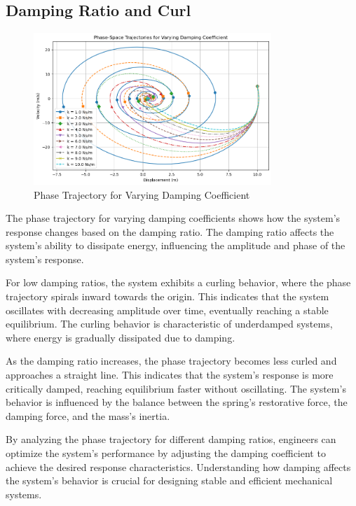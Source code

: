 \documentclass[12pt,a4paper]{article}
\begin{document}
{\vspace{5pt}}

\subsection{Damping Ratio and Curl}
\begin{figure}[H]
    \centering
    \includegraphics[width=0.8\textwidth]{damping_ratio_to_curl.png} 
    \caption{Phase Trajectory for Varying Damping Coefficient}
    \label{fig:system}
\end{figure}
{\vspace{10pt}}


The phase trajectory for varying damping coefficients shows how the system's response changes based on the damping ratio. The damping ratio affects the system's ability to dissipate energy, influencing the amplitude and phase of the system's response.

For low damping ratios, the system exhibits a curling behavior, where the phase trajectory spirals inward towards the origin. This indicates that the system oscillates with decreasing amplitude over time, eventually reaching a stable equilibrium. The curling behavior is characteristic of underdamped systems, where energy is gradually dissipated due to damping.

As the damping ratio increases, the phase trajectory becomes less curled and approaches a straight line. This indicates that the system's response is more critically damped, reaching equilibrium faster without oscillating. The system's behavior is influenced by the balance between the spring's restorative force, the damping force, and the mass's inertia.

By analyzing the phase trajectory for different damping ratios, engineers can optimize the system's performance by adjusting the damping coefficient to achieve the desired response characteristics. Understanding how damping affects the system's behavior is crucial for designing stable and efficient mechanical systems.
\end{document}
